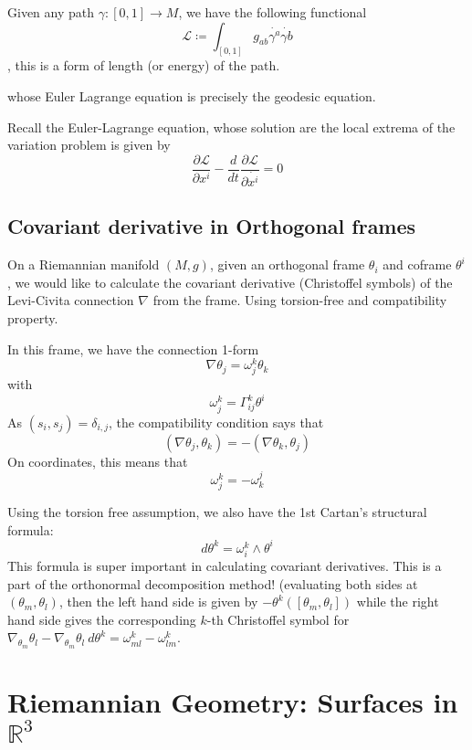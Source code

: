 \documentclass[main.tex]{subfiles}
\begin{document}
Given any path $\gamma: [0,1] \rightarrow M$, we have the following functional 
$$
\mathcal{L} \coloneqq \int_{[0,1]} g_{ab} \dot{\gamma^a} \dot{\gamma b}
$$, this is a form of length (or energy) of the path.

whose Euler Lagrange equation is precisely the geodesic equation. 

Recall the Euler-Lagrange equation, whose solution are the local extrema of the variation problem is given by 
$$
\frac{\partial \mathcal{L}}{\partial x^i} - \frac{d}{dt} \frac{\partial \mathcal{L}}{\partial \dot{x^i}} = 0
$$

\subsection{Covariant derivative in Orthogonal frames}

On a Riemannian manifold $(M, g)$, given an orthogonal frame $\theta_i$ and coframe $\theta^i$, we would like to calculate the covariant derivative (Christoffel symbols) of the Levi-Civita connection $\nabla$ from the frame. Using torsion-free and compatibility property.


In this frame, we have the connection 1-form 
$$
\nabla \theta_j = \omega_j ^k \theta_k
$$
with 
$$
\omega_j ^k = \Gamma_{ij}^k \theta^i
$$
As $(s_i, s_j) = \delta_{i,j}$, the compatibility condition says that 
$$
(\nabla \theta_j, \theta_k) = -(\nabla \theta_k, \theta_j)
$$
On coordinates, this means that 
$$
\omega_j ^k = - \omega_k ^j
$$

Using the torsion free assumption, we also have the 1st Cartan's structural formula:
$$
d\theta^k = \omega_i ^k \wedge \theta^i
$$
This formula is super important in calculating covariant derivatives. This is a part of the orthonormal decomposition method!
(evaluating both sides at $(\theta_m, \theta_l)$, then the left hand side is given by $-\theta^k([\theta_m, \theta_l])$ while the right hand side gives the corresponding $k$-th Christoffel symbol for $\nabla_{\theta_m} \theta_l - \nabla_{\theta_m}\theta_l \ d\theta^k= \omega^k _{ml} - \omega^k _{lm}$.

\section{Riemannian Geometry: Surfaces in $\mathbb{R}^3$}
\end{document}
